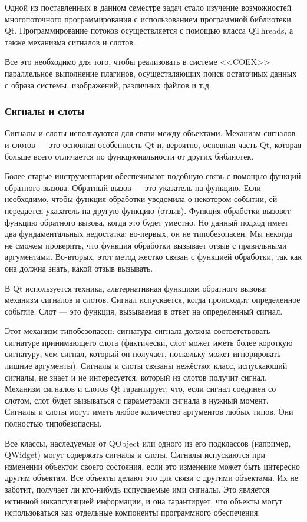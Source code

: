 Одной из поставленных в данном семестре задач стало изучение возможностей многопоточного программирования с использованием программной библиотеки Qt. Программирование потоков осуществляется с помощью класса QThreads, а также механизма сигналов и слотов.

Все это необходимо для того, чтобы реализовать в системе <<COEX>> параллельное выполнение плагинов, осуществляющих поиск остаточных данных с образа системы, изображений, различных файлов и т.д. 

\subsubsection{ Сигналы и слоты }

Сигналы и слоты используются для связи между объектами. Механизм сигналов и слотов --- это основная особенность Qt и, вероятно, основная часть Qt, которая больше всего отличается по функциональности от других библиотек.

Более старые инструментарии обеспечивают подобную связь с помощью функций обратного вызова. Обратный вызов --- это указатель на функцию. Если необходимо, чтобы функция обработки уведомила о некотором событии, ей передается указатель на другую функцию (отзыв). Функция обработки вызовет функцию обратного вызова, когда это будет уместно. Но данный подход имеет два фундаментальных недостатка: во-первых, он не типобезопасен. Мы некогда не сможем проверить, что функция обработки вызывает отзыв с правильными аргументами. Во-вторых, этот метод жестко связан с функцией обработки, так как она должна знать, какой отзыв вызывать.

В Qt используется техника, альтернативная функциям обратного вызова: механизм сигналов и слотов. Сигнал испускается, когда происходит определенное событие. Слот --- это функция, вызываемая в ответ на определенный сигнал.

Этот механизм типобезопасен: сигнатура сигнала должна соответствовать сигнатуре принимающего слота (фактически, слот может иметь более короткую сигнатуру, чем сигнал, который он получает, поскольку может игнорировать лишние аргументы). Сигналы и слоты связаны нежёстко: класс, испускающий сигналы, не знает и не интересуется, который из слотов получит сигнал. Механизм сигналов и слотов Qt гарантирует, что, если сигнал соединен со слотом, слот будет вызываться с параметрами сигнала в нужный момент. Сигналы и слоты могут иметь любое количество аргументов любых типов. Они полностью типобезопасны.

Все классы, наследуемые от QObject или одного из его подклассов (например, QWidget) могут содержать сигналы и слоты. Сигналы испускаются при изменении объектом своего состояния, если это изменение может быть интересно другим объектам. Все объекты делают это для связи с другими объектами. Их не заботит, получает ли кто-нибудь испускаемые ими сигналы. Это является истинной инкапсуляцией информации, и она гарантирует, что объекты могут использоваться как отдельные компоненты программного обеспечения.

